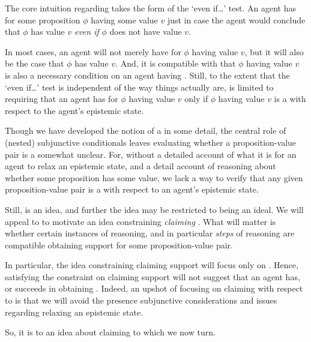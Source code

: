 \begin{note}
  The core intuition regarding \support{} takes the form of the `even if\dots' test.
  An agent has \support{} for some proposition \(\phi\) having some value \(v\) just in case the agent would conclude that \(\phi\) has value \(v\) \emph{even if} \(\phi\) does not have value \(v\).

  In most cases, an agent will not merely have \support{} for \(\phi\) having value \(v\), but it will also be the case that \(\phi\) has value \(v\).
  And, it is compatible with \ideaS{} that \(\phi\) having value \(v\) is also a necessary condition on an agent having \support{}.
  Still, to the extent that the `even if\dots' test is independent of the way things actually are, \ideaS{} is limited to requiring that an agent has \support{} for \(\phi\) having value \(v\) only if \(\phi\) having value \(v\) is a \sink{} with respect to the agent's epistemic state.

  Though we have developed the notion of a \sink{} in some detail, the central role of (nested) subjunctive conditionals leaves evaluating whether a proposition-value pair is a \sink{} somewhat unclear.
  For, without a detailed account of what it is for an agent to relax an epistemic state, and a detail account of reasoning about whether some proposition has some value, we lack a way to verify that any given proposition-value pair is a \sink{} with respect to an agent's epistemic state.

  Still, \ideaS{} is an idea, and further the idea may be restricted to being an ideal.
  We will appeal to \ideaS{} to motivate an idea constraining \emph{claiming} \support{}.
  What will matter is whether certain instances of reasoning, and in particular \emph{steps} of reasoning are compatible obtaining support for some proposition-value pair.

  In particular, the idea constraining claiming support will focus only on .
  Hence, satisfying the constraint on claiming support will not suggest that an agent has, or succeeds in obtaining \support{}.
  Indeed, an upshot of focusing on claiming with respect to  is that we will avoid the presence subjunctive considerations and issues regarding relaxing an epistemic state.

  So, it is to an idea about claiming \support{} to which we now turn.
\end{note}



